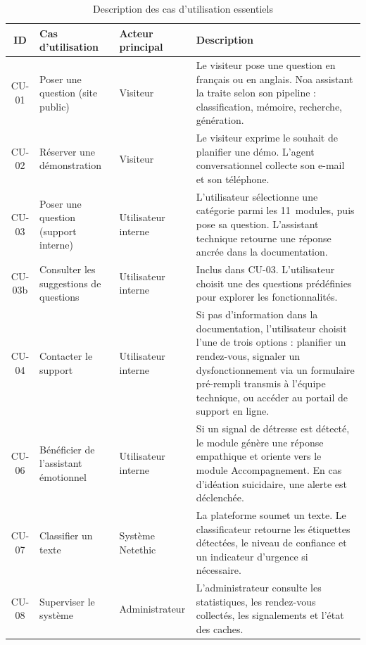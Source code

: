 \vspace{6pt}
\begin{table}[H]
\caption{Description des cas d'utilisation essentiels}
\label{tab:cas_utilisation}
\centering
\small
\setlength{\tabcolsep}{3pt}
\begin{tabular}{|c|p{3cm}|p{2.8cm}|p{7.2cm}|}
\hline
\textbf{ID} & \textbf{Cas d'utilisation} & \textbf{Acteur principal} & \textbf{Description} \\
\hline
CU-01 & Poser une question (site public)
       & Visiteur
       & Le visiteur pose une question en français ou en anglais.
         Noa assistant la traite selon son pipeline : classification, mémoire, recherche, génération. \\
\hline
CU-02 & Réserver une démonstration
       & Visiteur
       & Le visiteur exprime le souhait de planifier une démo.
         L'agent conversationnel collecte son e-mail et son téléphone. \\
\hline
CU-03 & Poser une question (support interne)
       & Utilisateur interne
       & L'utilisateur sélectionne une catégorie parmi les 11~modules, puis pose sa question.
         L'assistant technique retourne une réponse ancrée dans la documentation. \\
\hline
CU-03b & Consulter les suggestions de questions
        & Utilisateur interne
        & Inclus dans CU-03. L'utilisateur choisit une des questions prédéfinies pour explorer les fonctionnalités. \\
\hline
CU-04 & Contacter le support
       & Utilisateur interne
       & Si pas d'information dans la documentation, l'utilisateur choisit l'une de trois options : planifier un rendez-vous, signaler un dysfonctionnement via un formulaire pré-rempli transmis à l'équipe technique, ou accéder au portail de support en ligne. \\
\hline
CU-06 & Bénéficier de l'assistant émotionnel
       & Utilisateur interne
       & Si un signal de détresse est détecté, le module génère une réponse empathique
         et oriente vers le module Accompagnement. En cas d'idéation suicidaire, une alerte est déclenchée. \\
\hline
CU-07 & Classifier un texte
       & Système Netethic
       & La plateforme soumet un texte. Le classificateur retourne les étiquettes détectées,
         le niveau de confiance et un indicateur d'urgence si nécessaire. \\
\hline
CU-08 & Superviser le système
       & Administrateur
       & L'administrateur consulte les statistiques, les rendez-vous collectés,
         les signalements et l'état des caches. \\
\hline
\end{tabular}
\end{table}

